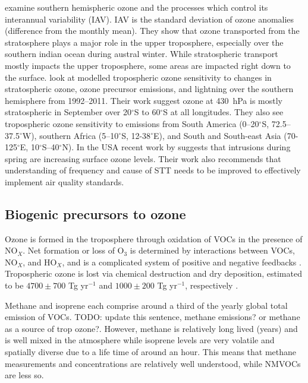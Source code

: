     \cite{Liu2017} examine southern hemispheric ozone and the processes which control its interannual variability (IAV).
    IAV is the standard deviation of ozone anomalies (difference from the monthly mean).
    They show that ozone transported from the stratosphere plays a major role in the upper troposphere, especially over the southern indian ocean during austral winter.
    While stratospheric transport mostly impacts the upper troposphere, some areas are impacted right down to the surface.
    \citet{Liu2017} look at modelled tropospheric ozone sensitivity to changes in stratospheric ozone, ozone precursor emissions, and lightning over the southern hemisphere from 1992--2011. 
    Their work suggest ozone at 430~hPa is mostly stratospheric in September over 20$^{\circ}$S to 60$^{\circ}$S at all longitudes.
    They also see tropospheric ozone sensitivity to emissions from South America (0--20$^{\circ}$S, 72.5--37.5$^{\circ}$W), southern Africa (5--10$^{\circ}$S, 12-38$^{\circ}$E), and South and South-east Asia (70-125$^{\circ}$E, 10$^{\circ}$S--40$^{\circ}$N).
    In the USA recent work by \cite{Lin2015} suggests that intrusions during spring are increasing surface ozone levels.
    Their work also recommends that understanding of frequency and cause of STT needs to be improved to effectively implement air quality standards.
    
  \subsection{Biogenic precursors to ozone}
    \label{LR:O3andAQ:BiogenicOzonePrecursors}
    
    Ozone is formed in the troposphere through oxidation of VOCs in the presence of NO$_X$.
    Net formation or loss of O$_3$ is determined by interactions between VOCs, NO$_X$, and HO$_X$, and is a complicated system of positive and negative feedbacks \citep{Atkinson2000}.
    Tropospheric ozone is lost via chemical destruction and dry deposition, estimated to be $4700\pm700$ Tg yr$^{-1}$ and $1000\pm200$ Tg yr$^{-1}$, respectively \citep{Stevenson2006}.
    
    Methane and isoprene each comprise around a third of the yearly global total emission of VOCs. TODO: update this sentence, methane emissions? or methane as a source of trop ozone?.
    However, methane is relatively long lived (years) and is well mixed in the atmosphere while isoprene levels are very volatile and spatially diverse due to a life time of around an hour.
    This means that methane measurements and concentrations are relatively well understood, while NMVOCs are less so.
    
